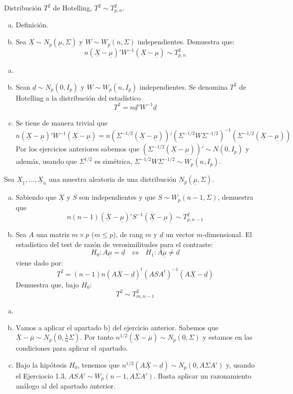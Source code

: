 \documentclass[twoside]{article}
\newcommand{\media}[1]{{\overline{#1}}}
\newcommand{\muestra}[1]{{\underline{#1}}}
\newcommand{\m}[1]{{\muestra{#1}}}
\newcommand{\mX}{{\muestra{X}}}
\begin{document}
\begin{ejercicio}{1.4}
Distribución $T^2$ de Hotelling, $T^2 \sim T^2_{p,n}$.
\begin{enumerate}[(a)]
\item Definición.
\item Sea $\mX \sim N_p(\m{μ},Σ)$ y $W \sim W_p(n,Σ)$ independientes. Demuestra que:
\[ n(\mX-\m{μ})' W^{-1} (\mX-\m{μ}) \sim T^2_{p,n} \]
\end{enumerate}
\end{ejercicio}
\begin{solucion}
\begin{enumerate}[(a)]
\item[]
\item Sean $\muestra{d}\sim N_p(0,I_p)$ y $W\sim W_p(n,I_p)$ independientes. Se denomina $T^2$ de Hotelling a la distribución del estadístico 
$$
T^2= n\muestra{d}'W^{-1}\muestra{d}
$$
\item Se tiene de manera trivial que
$$
n(\mX-\m{μ})' W^{-1} (\mX-\m{μ}) =n(\Sigma^{-1/2}(\mX-\m{μ}))'(\Sigma^{-1/2} W \Sigma^{-1/2})^{-1}(\Sigma^{-1/2} (\mX-\m{μ}))
$$
Por los ejercicios anteriores sabemos que $(\Sigma^{-1/2}(\mX-\m{μ}))' \sim N(0,I_p)$ y además, usando que $\Sigma^{1/2}$ es simétrica, $\Sigma^{-1/2} W \Sigma^{-1/2} \sim W_p(n,I_p)$.
\end{enumerate}
\end{solucion}
\newpage

\begin{ejercicio}{1.5}
Sea $\mX_1,\dots,\mX_n$ una muestra aleatoria de una distribución $N_p(\m{μ},Σ)$.
\begin{enumerate}[(a)]
\item Sabiendo que $\media{\mX}$ y $S$ son independientes y que $S \sim W_p(n-1,Σ)$, demuestra que
\[ n(n-1)(\media{\mX}-\m{μ})' S^{-1} (\media{\mX}-\m{μ}) \sim T^2_{p,n-1}\]
\item Sea $A$ una matriz $m\times p$ ($m≤p$), de rang $m$ y $\m{d}$ un vector $m$-dimensional.
El estadístico del test de razón de verosimilitudes para el contraste:
\[ H_0 \colon A\m{μ} = \m{d} \quad vs \quad H_1 \colon A\m{μ} \neq \m{d} \]
viene dado por:
\[ T^2 = (n-1)n (A\media{\mX}-\muestra{d})^t (ASA^t)^{-1} (A \media{\mX}-\m{d}) \]
Demuestra que, bajo $H_0$:
\[ T^2 \sim T^2_{m,n-1} \]
\end{enumerate}
\end{ejercicio}
\begin{solucion}
\begin{enumerate}[(a)]
\item[]
\item Vamos a aplicar el apartado b) del ejercicio anterior. Sabemos que $\media{\mX}-\media{\mu}\sim N_p(0,  \frac{1}{n}\Sigma)$. Por tanto $n^{1/2}(\media{\mX}-\media{\mu})\sim N_p(0, \Sigma)$ y estamos en las condiciones para aplicar el apartado.
\item Bajo la hipótesis $H_0$, tenemos que $n^{1/2}(A\media{\mX}-\muestra{d})\sim N_p(0,A\Sigma A')$ y, usando el Ejerciocio 1.3,  $ASA'\sim W_p(n-1,A\Sigma A')$. Basta aplicar un razonamiento análogo al del apartado anterior.
\end{enumerate}
\end{solucion}
\end{document}
